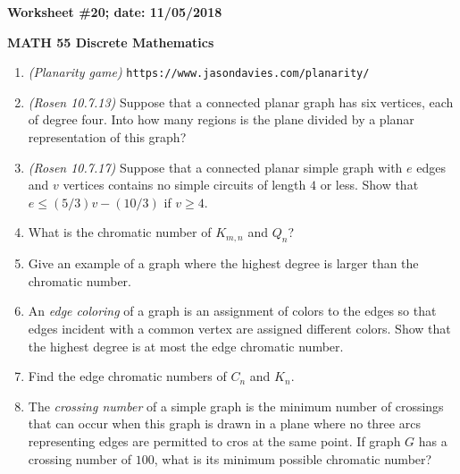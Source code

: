 \documentclass{article}
\begin{document}
{\bf Worksheet \#20; date: 11/05/2018}

{\bf MATH 55 Discrete Mathematics}

\begin{enumerate}
\item {\em (Planarity game)} {\tt https://www.jasondavies.com/planarity/}

\item {\em (Rosen 10.7.13)} Suppose that a connected planar graph has six vertices, each of degree four. Into how many regions is the plane divided by a planar representation of this graph?

\item {\em (Rosen 10.7.17)} Suppose that a connected planar simple graph with $e$ edges and $v$ vertices contains no simple circuits of length $4$ or less. Show that $e \le (5/3)v - (10/3)$ if $v \ge 4$.

\item What is the chromatic number of $K_{m, n}$ and $Q_n$?

\item Give an example of a graph where the highest degree is larger than the chromatic number.

\item An {\em edge coloring} of a graph is an assignment of colors to the edges so that edges incident with a common vertex are assigned different colors. Show that the highest degree is at most the edge chromatic number.

\item Find the edge chromatic numbers of $C_n$ and $K_n$.

\item The {\em crossing number} of a simple graph is the minimum number of crossings that can occur when this graph is drawn in a plane where no three arcs representing edges are permitted to cros at the same point. If graph $G$ has a crossing number of $100$, what is its minimum possible chromatic number?
\end{enumerate}
\end{document}

